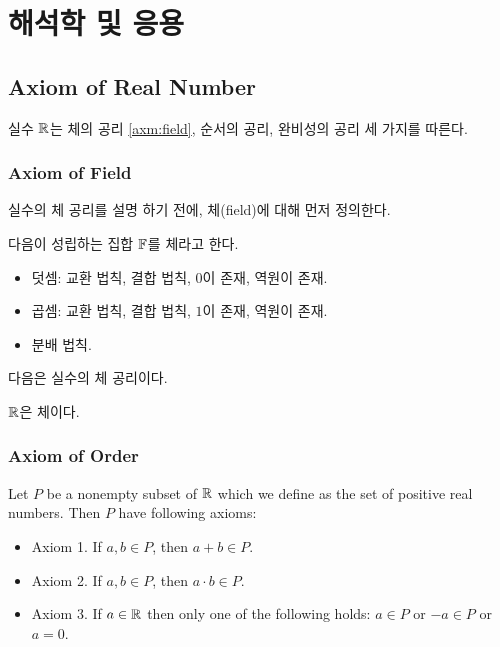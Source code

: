 \chapter{해석학 및 응용}


\section{Axiom of Real Number}
실수 $\mathbb{R}$는 체의 공리 \ref{axm:field}, 순서의 공리, 완비성의 공리 세 가지를 따른다.

\subsection*{Axiom of Field}

실수의 체 공리를 설명 하기 전에, 체(field)에 대해 먼저 정의한다.

\begin{definition}
  다음이 성립하는 집합 $\mathbb{F}$를 체라고 한다.
  \begin{itemize}
    \item 덧셈: 교환 법칙, 결합 법칙, $0$이 존재, 역원이 존재.
    \item 곱셈: 교환 법칙, 결합 법칙, $1$이 존재, 역원이 존재.
    \item 분배 법칙.
  \end{itemize}
  \label{def:field}
\end{definition}

다음은 실수의 체 공리이다.

\begin{axiom}
  $\mathbb{R}$은 체이다.
  \label{axm:field}
\end{axiom}

\subsection*{Axiom of Order}


\begin{axiom}
  Let $P$ be a nonempty subset of $\mathbb{R}$ which we define as the set of positive
  real numbers. Then $P$ have following axioms:
  \begin{itemize}
    \item Axiom 1. If $a, b \in P$, then $a + b \in P$.
    \item Axiom 2. If $a, b \in P$, then $a \cdot b \in P$.
    \item Axiom 3. If $a \in \mathbb{R}$ then only one of the following holds: $a \in P$
          or $-a \in P$ or $a = 0$.
  \end{itemize}
\end{axiom}

